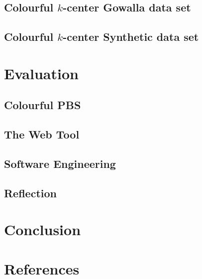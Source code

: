 \documentclass{article}
\begin{document}
    \subsection{Colourful \texorpdfstring{$k$}{k}-center Gowalla data set}\label{section:colourful_k_center_gowalla}
    
    
    \subsection{Colourful \texorpdfstring{$k$}{k}-center Synthetic data set}\label{section:colourful_k_center_synthetic}
    

\newpage
\section{Evaluation}\label{section:evaluation}
    \subsection{Colourful PBS}
    
    
    \subsection{The Web Tool}
    
    
    \subsection{Software Engineering}
    
    
    \subsection{Reflection}
    

\newpage
\section{Conclusion}\label{section:conclusion}

    
\newpage
\section{References}
\sloppy{\printbibliography[heading=none]}
\end{document}
